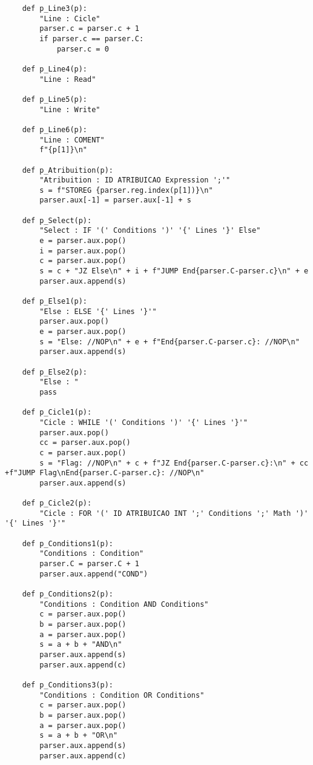 \documentclass[12pt,a4paper]{report}
\begin{document}
\begin{lstlisting}
    def p_Line3(p):
        "Line : Cicle"
        parser.c = parser.c + 1
        if parser.c == parser.C:
            parser.c = 0
    
    def p_Line4(p):
        "Line : Read"
    
    def p_Line5(p):
        "Line : Write"
    
    def p_Line6(p):
        "Line : COMENT"
        f"{p[1]}\n"
        
    def p_Atribuition(p):
        "Atribuition : ID ATRIBUICAO Expression ';'"
        s = f"STOREG {parser.reg.index(p[1])}\n"
        parser.aux[-1] = parser.aux[-1] + s
    
    def p_Select(p):
        "Select : IF '(' Conditions ')' '{' Lines '}' Else"
        e = parser.aux.pop()
        i = parser.aux.pop()
        c = parser.aux.pop()
        s = c + "JZ Else\n" + i + f"JUMP End{parser.C-parser.c}\n" + e
        parser.aux.append(s)
    
    def p_Else1(p):
        "Else : ELSE '{' Lines '}'"
        parser.aux.pop()
        e = parser.aux.pop()
        s = "Else: //NOP\n" + e + f"End{parser.C-parser.c}: //NOP\n"
        parser.aux.append(s)
    
    def p_Else2(p):
        "Else : "
        pass
    
    def p_Cicle1(p):
        "Cicle : WHILE '(' Conditions ')' '{' Lines '}'"
        parser.aux.pop()
        cc = parser.aux.pop()
        c = parser.aux.pop()
        s = "Flag: //NOP\n" + c + f"JZ End{parser.C-parser.c}:\n" + cc +f"JUMP Flag\nEnd{parser.C-parser.c}: //NOP\n"
        parser.aux.append(s)
    
    def p_Cicle2(p):
        "Cicle : FOR '(' ID ATRIBUICAO INT ';' Conditions ';' Math ')' '{' Lines '}'"
    
    def p_Conditions1(p):
        "Conditions : Condition"
        parser.C = parser.C + 1
        parser.aux.append("COND")
    
    def p_Conditions2(p):
        "Conditions : Condition AND Conditions"
        c = parser.aux.pop()
        b = parser.aux.pop()
        a = parser.aux.pop()
        s = a + b + "AND\n"
        parser.aux.append(s)
        parser.aux.append(c)
               
    def p_Conditions3(p):
        "Conditions : Condition OR Conditions"
        c = parser.aux.pop()
        b = parser.aux.pop()
        a = parser.aux.pop()
        s = a + b + "OR\n"
        parser.aux.append(s)
        parser.aux.append(c)
    

\end{lstlisting}
\end{document}
